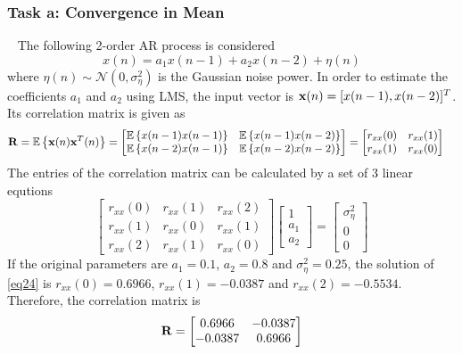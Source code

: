 \documentclass[10pt]{article}
\begin{document}
\subsubsection{Task a: Convergence in Mean}
\ \indent
The following 2-order AR process is considered
\begin{equation}
	x(n) = a_1 x(n-1) + a_2 x(n-2) + \eta(n) \label{eq22}
\end{equation}
where $\eta(n) \sim \mathcal{N}(0, \sigma_{\eta}^2)$ is the Gaussian noise power.
In order to estimate the coefficients $a_1$ and $a_2$ using LMS, the input vector is 
${\bf{x}}(n) = [x(n-1), x(n-2)]^T$. Its correlation matrix is given as
\begin{align}
	{\bf{R}} & = \mathbb{E} \left\{ {\bf{x}}(n) {\bf{x}}^T(n) \right\} = \left[\begin{matrix}
		\mathbb{E} \left\{ x(n-1) x(n-1) \right\} & \mathbb{E} \left\{ x(n-1) x(n-2) \right\} \\
		\mathbb{E} \left\{ x(n-2) x(n-1) \right\} & \mathbb{E} \left\{ x(n-2) x(n-2) \right\}	\end{matrix}\right]	= \left[ \begin{matrix}
		r_{xx}(0) & r_{xx}(1)\\
		r_{xx}(1) & r_{xx}(0)
	\end{matrix} \right]
\end{align}
The entries of the correlation matrix can be calculated by a set of 3 linear equtions
\begin{equation}
	\left[
		\begin{matrix}
			r_{xx}(0) & r_{xx}(1) & r_{xx}(2)\\
			r_{xx}(1) & r_{xx}(0) & r_{xx}(1)\\
			r_{xx}(2) & r_{xx}(1) & r_{xx}(0)
		\end{matrix}
	\right] 
	\left[
		\begin{matrix}
			1 \\ a_1 \\ a_2
		\end{matrix}
	\right]
	= \left[
		\begin{matrix}
			\sigma_{\eta}^2 \\ 0 \\ 0
		\end{matrix}
	\right] \label{eq24}
\end{equation}
If the original parameters are $a_1=0.1$, $a_2=0.8$ and $\sigma_{\eta}^2=0.25$,
the solution of \eqref{eq24} is $r_{xx}(0) = 0.6966$, $r_{xx}(1)=-0.0387$ and $r_{xx}(2) = -0.5534$.
Therefore, the correlation matrix is 
\begin{equation}
	{\bf{R}} = \left[
		\begin{matrix}
			0.6966 & -0.0387 \\
			-0.0387 & 0.6966
		\end{matrix}
	\right] \label{eq25}
\end{equation}
\end{document}
